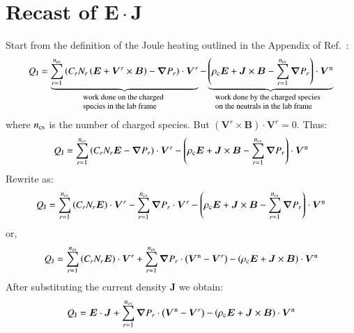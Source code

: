 \documentclass{warpdoc}
\renewcommand{\vec}[1]{\bm{#1}}
\begin{document}
\section{Recast of $\vec{E}\cdot \vec{J}$}

Start from the definition of the Joule heating outlined in the Appendix of Ref.\ \cite{aiaa:2016:parent}:
%
\begin{equation}
 Q_{\rm J} = \underbrace{  \sum_{r=1}^{n_{\rm cs}} \left( C_r N_r \left( \vec{E}+\vec{V}^r \times\vec{B}\right)  - \vec{\nabla} P_r \right)\cdot \vec{V}^r}_{\textrm{\begin{minipage}{3cm}\flushleft \footnotesize work done on the charged species in the lab frame\end{minipage}}} 
- \underbrace{\left(\rho_{\rm c} \vec{E} + \vec{J}\times\vec{B} -\sum_{r=1}^{n_{\rm cs}} \vec{\nabla} P_r \right)\cdot \vec{V}^{\rm n}}_{\textrm{\begin{minipage}{4cm}\flushleft \footnotesize work done by the charged species on the neutrals in the lab frame\end{minipage}}}
\end{equation}
%
where $n_{\rm cs}$ is the number of charged species. But $(\vec{V}^r \times\vec{B})\cdot \vec{V}^r=0$. Thus:
%
\begin{equation}
 Q_{\rm J} =   \sum_{r=1}^{n_{\rm cs}} \left( C_r N_r  \vec{E}  - \vec{\nabla} P_r \right)\cdot \vec{V}^r 
- \left(\rho_{\rm c} \vec{E} + \vec{J}\times\vec{B} -\sum_{r=1}^{n_{\rm cs}} \vec{\nabla} P_r \right)\cdot \vec{V}^{\rm n}
\end{equation}
%
Rewrite as:
%
\begin{equation}
 Q_{\rm J} =   \sum_{r=1}^{n_{\rm cs}} \left( C_r N_r  \vec{E}   \right)\cdot \vec{V}^r 
-  \sum_{r=1}^{n_{\rm cs}} \vec{\nabla} P_r \cdot \vec{V}^r 
- \left(\rho_{\rm c} \vec{E} + \vec{J}\times\vec{B} -\sum_{r=1}^{n_{\rm cs}} \vec{\nabla} P_r \right)\cdot \vec{V}^{\rm n}
\end{equation}
%
or,
%
\begin{equation}
 Q_{\rm J} =   \sum_{r=1}^{n_{\rm cs}} \left( C_r N_r  \vec{E}   \right)\cdot \vec{V}^r 
+  \sum_{r=1}^{n_{\rm cs}} \vec{\nabla} P_r \cdot \left(\vec{V}^{\rm n}-\vec{V}^r\right) 
- \left(\rho_{\rm c} \vec{E} + \vec{J}\times\vec{B} \right)\cdot \vec{V}^{\rm n}
\end{equation}
%
After substituting the current density $\vec{J}$ we obtain: 
%
\begin{equation}
 Q_{\rm J} =     \vec{E} \cdot \vec{J} 
+  \sum_{r=1}^{n_{\rm cs}} \vec{\nabla} P_r \cdot \left(\vec{V}^{\rm n}-\vec{V}^r\right) 
- \left(\rho_{\rm c} \vec{E} + \vec{J}\times\vec{B} \right)\cdot \vec{V}^{\rm n}
\end{equation}
\end{document}
